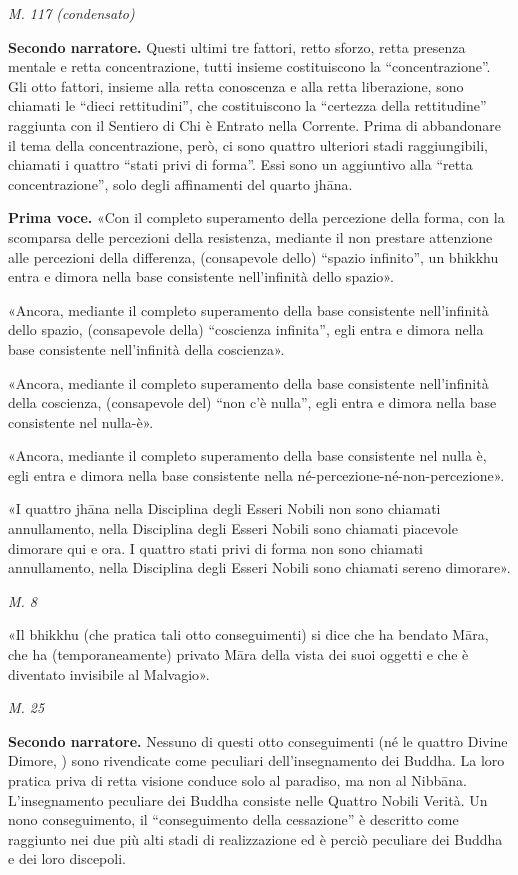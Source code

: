 \emph{M. 117 (condensato)}


\textbf{Secondo narratore.} Questi ultimi tre fattori, retto sforzo, retta
presenza mentale e retta concentrazione, tutti insieme costituiscono la
“concentrazione”. Gli otto fattori, insieme alla retta conoscenza e alla
retta liberazione, sono chiamati le “dieci rettitudini”, che
costituiscono la “certezza della rettitudine” raggiunta con il Sentiero
di Chi è Entrato nella Corrente. Prima di abbandonare il tema della
concentrazione, però, ci sono quattro ulteriori stadi raggiungibili,
chiamati i quattro “stati privi di forma”. Essi sono un aggiuntivo alla
“retta concentrazione”, solo degli affinamenti del quarto jhāna.


\textbf{Prima voce.} «Con il completo superamento della percezione della forma,
con la scomparsa delle percezioni della resistenza, mediante il non
prestare attenzione alle percezioni della differenza, (consapevole
dello) “spazio infinito”, un bhikkhu entra e dimora nella base
consistente nell’infinità dello spazio».


«Ancora, mediante il completo superamento della base consistente
nell’infinità dello spazio, (consapevole della) “coscienza infinita”,
egli entra e dimora nella base consistente nell’infinità della
coscienza».


«Ancora, mediante il completo superamento della base consistente
nell’infinità della coscienza, (consapevole del) “non c’è nulla”, egli
entra e dimora nella base consistente nel nulla-è».


«Ancora, mediante il completo superamento della base consistente nel
nulla è, egli entra e dimora nella base consistente nella
né-percezione-né-non-percezione».


«I quattro jhāna nella Disciplina degli Esseri Nobili non sono chiamati
annullamento, nella Disciplina degli Esseri Nobili sono chiamati
piacevole dimorare qui e ora. I quattro stati privi di forma non sono
chiamati annullamento, nella Disciplina degli Esseri Nobili sono
chiamati sereno dimorare».


\emph{M. 8}


«Il bhikkhu (che pratica tali otto conseguimenti) si dice che ha bendato
Māra, che ha (temporaneamente) privato Māra della vista dei suoi oggetti
e che è diventato invisibile al Malvagio».


\emph{M. 25}


\textbf{Secondo narratore.} Nessuno di questi otto conseguimenti (né le quattro
Divine Dimore, \hyperlink{cap-10-Il-periodo-di-mezzo#pag200b}{}) sono rivendicate come peculiari
dell’insegnamento dei Buddha. La loro pratica priva di retta visione
conduce solo al paradiso, ma non al Nibbāna. L’insegnamento peculiare
dei Buddha consiste nelle Quattro Nobili Verità. Un nono conseguimento, il
“conseguimento della cessazione” è descritto come raggiunto nei due più
alti stadi di realizzazione ed è perciò peculiare dei Buddha e dei loro
discepoli.


